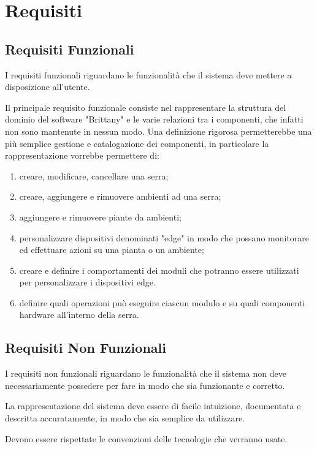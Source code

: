 \section{Requisiti}

\subsection{Requisiti Funzionali}

I requisiti funzionali riguardano le funzionalità che il sistema deve mettere a disposizione all’utente.

\noindent Il principale requisito funzionale consiste nel rappresentare la struttura del dominio del software "Brittany" e le varie relazioni tra i componenti, che infatti non sono mantenute in nessun modo. Una definizione rigorosa permetterebbe una più semplice gestione e catalogazione dei componenti, in particolare la rappresentazione vorrebbe permettere di:
\begin{enumerate}
	\item creare, modificare, cancellare una serra;
	\item creare, aggiungere e rimuovere ambienti ad una serra;
	\item aggiungere e rimuovere piante da ambienti;
	\item personalizzare dispositivi denominati "edge" in modo che possano monitorare ed effettuare azioni su una pianta o un ambiente;
	\item creare e definire i comportamenti dei moduli che potranno essere utilizzati per personalizzare i dispositivi edge.
	\item definire quali operazioni può eseguire ciascun modulo e su quali componenti hardware all'interno della serra.
\end{enumerate}

\subsection{Requisiti Non Funzionali}
I requisiti non funzionali riguardano le funzionalità che il sistema non deve necessariamente possedere per fare in modo che sia funzionante e corretto.\newline

\noindent La rappresentazione del sistema deve essere di facile intuizione, documentata e descritta accuratamente, in modo che sia semplice da utilizzare.\newline

\noindent Devono essere rispettate le convenzioni delle tecnologie che verranno usate.

